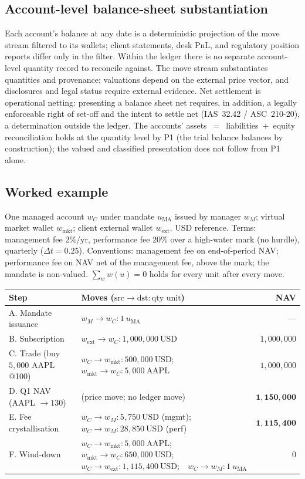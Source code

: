 \subsection{Account-level balance-sheet substantiation}
\label{sec:sec09-substantiation}

Each account's balance at any date is a deterministic projection of the move stream filtered to its
wallets; client statements, desk PnL, and regulatory position reports differ only in the filter.
Within the ledger there is no separate account-level quantity record to reconcile against. The move
stream substantiates quantities and provenance; valuations depend on the external price vector, and
disclosures and legal status require external evidence. Net settlement is operational netting:
presenting a balance sheet net requires, in addition, a legally enforceable right of set-off and
the intent to settle net (IAS~32.42 / ASC~210-20), a determination outside the ledger. The
accounts' assets~$=$~liabilities~$+$~equity reconciliation holds at the quantity level by P1 (the
trial balance balances by construction); the valued and classified presentation does not follow
from P1 alone.

\subsection{Worked example}
\label{sec:sec09-example}

One managed account $w_C$ under mandate $u_{\mathrm{MA}}$ issued by manager $w_M$; virtual market
wallet $w_{\text{mkt}}$; client external wallet $w_{\text{ext}}$. USD reference. Terms: management
fee $2\%/\text{yr}$, performance fee $20\%$ over a high-water mark (no hurdle), quarterly
($\Delta t=0.25$). Conventions: management fee on end-of-period NAV; performance fee on NAV net of
the management fee, above the mark; the mandate is non-valued. $\sum_w w(u)=0$ holds for every unit
after every move.

\begin{longtable}{p{4.3cm}p{7.2cm}r}
\toprule
\textbf{Step} & \textbf{Moves} ($\text{src}\to\text{dst}:\text{qty unit}$) & \textbf{NAV} \\
\midrule
A. Mandate issuance & $w_M\to w_C:1\ u_{\mathrm{MA}}$ & --- \\
B. Subscription & $w_{\text{ext}}\to w_C:1{,}000{,}000\ \text{USD}$ & $1{,}000{,}000$ \\
C. Trade (buy $5{,}000$ AAPL @100) & $w_C\to w_{\text{mkt}}:500{,}000\ \text{USD}$;\ \ $w_{\text{mkt}}\to w_C:5{,}000\ \text{AAPL}$ & $1{,}000{,}000$ \\
D. Q1 NAV (AAPL $\to 130$) & (price move; no ledger move) & $\mathbf{1{,}150{,}000}$ \\
E. Fee crystallisation & $w_C\to w_M:5{,}750\ \text{USD}$ (mgmt);\ \ $w_C\to w_M:28{,}850\ \text{USD}$ (perf) & $\mathbf{1{,}115{,}400}$ \\
F. Wind-down & $w_C\to w_{\text{mkt}}:5{,}000\ \text{AAPL}$;\ \ $w_{\text{mkt}}\to w_C:650{,}000\ \text{USD}$;\ \ $w_C\to w_{\text{ext}}:1{,}115{,}400\ \text{USD}$;\ \ $w_C\to w_M:1\ u_{\mathrm{MA}}$ & $0$ \\
\bottomrule
\end{longtable}

